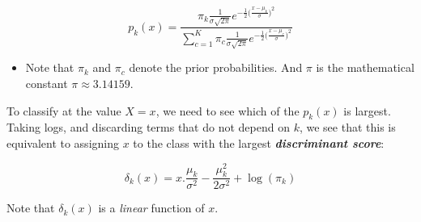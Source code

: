\documentclass[]{book}
\newenvironment{rmdblock}[1]
  {\begin{shaded*}
  \begin{itemize}
  \renewcommand{\labelitemi}{
    \raisebox{-.7\height}[0pt][0pt]{
      {\setkeys{Gin}{width=2em,keepaspectratio}\texttt{[image: img/icons/\#1]}}
    }
  }
  \item
  }
  {
  \end{itemize}
  \end{shaded*}
  }
\newenvironment{rmdcaution}
  {\begin{rmdblock}{caution}}
  {\end{rmdblock}}
\theoremstyle{definition}
\theoremstyle{definition}
\theoremstyle{definition}
\theoremstyle{remark}
\begin{document}
\begin{equation}
p_k(x) = \frac{  \pi_k \frac{1}{\sigma \sqrt{2\pi}} e^{-\frac{1}{2} \big(\frac{x-\mu_k}{\sigma}\big)^2 } }{  \sum_{c=1}^K  \pi_c \frac{1}{\sigma \sqrt{2\pi}} e^{-\frac{1}{2} \big(\frac{x-\mu_c}{\sigma}\big)^2 } }
\label{eq:pkx}
\end{equation}

\begin{rmdcaution}
Note that \(\pi_k\) and \(\pi_c\) denote the prior probabilities. And
\(\pi\) is the mathematical constant \(\pi \approx 3.14159\).
\end{rmdcaution}

To classify at the value \(X = x\), we need to see which of the
\(p_k(x)\) is largest. Taking logs, and discarding terms that do not
depend on \(k\), we see that this is equivalent to assigning \(x\) to
the class with the largest \textbf{\emph{discriminant score}}:

\begin{equation}
\delta_k(x) = x.\frac{\mu_k}{\sigma^2} - \frac{\mu_k^2}{2\sigma^2} + \log (\pi_k)
\label{eq:discscore}
\end{equation}

Note that \(\delta_k(x)\) is a \emph{linear} function of \(x\).
\end{document}
